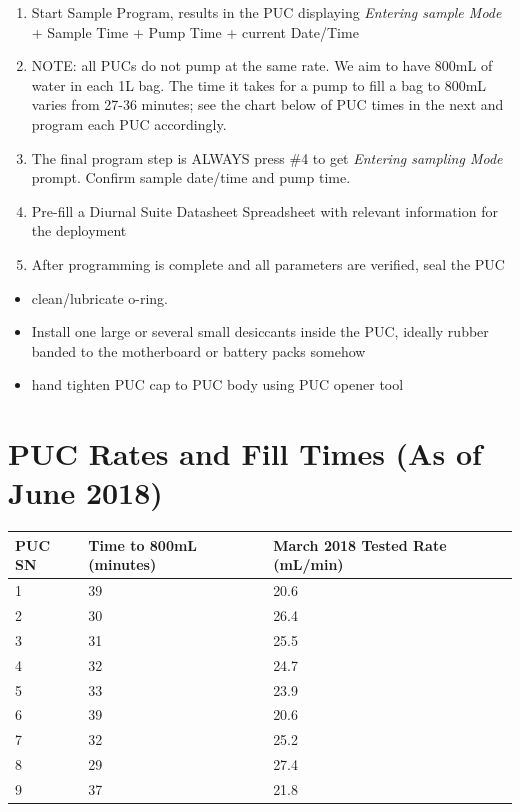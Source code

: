\documentclass[
]{book}
\providecommand{\tightlist}{%
  \setlength{\itemsep}{0pt}\setlength{\parskip}{0pt}}
\begin{document}
\begin{enumerate}
\def\labelenumi{\arabic{enumi}.}
\setcounter{enumi}{6}
\item
  Start Sample Program, results in the PUC displaying \emph{Entering sample Mode} + Sample Time + Pump Time + current Date/Time
\item
  NOTE: all PUCs do not pump at the same rate. We aim to have 800mL of water in each 1L bag. The time it takes for a pump to fill a bag to 800mL varies from 27-36 minutes; see the chart below of PUC times in the next and program each PUC accordingly.
\item
  The final program step is ALWAYS press \#4 to get \emph{Entering sampling Mode} prompt. Confirm sample date/time and pump time.
\item
  Pre-fill a Diurnal Suite Datasheet Spreadsheet with relevant information for the deployment
\item
  After programming is complete and all parameters are verified, seal the PUC
\end{enumerate}

\begin{itemize}
\tightlist
\item
  clean/lubricate o-ring.
\item
  Install one large or several small desiccants inside the PUC, ideally rubber banded to the motherboard or battery packs somehow
\item
  hand tighten PUC cap to PUC body using PUC opener tool
\end{itemize}

\hypertarget{puc-rates-and-fill-times-as-of-june-2018}{%
\section{PUC Rates and Fill Times (As of June 2018)}\label{puc-rates-and-fill-times-as-of-june-2018}}

\begin{longtable}[]{@{}lll@{}}
\toprule
\textbf{PUC SN} & \textbf{Time to 800mL (minutes)} & \textbf{March 2018 Tested Rate (mL/min)} \\
\midrule
\endhead
1 & 39 & 20.6 \\
2 & 30 & 26.4 \\
3 & 31 & 25.5 \\
4 & 32 & 24.7 \\
5 & 33 & 23.9 \\
6 & 39 & 20.6 \\
7 & 32 & 25.2 \\
8 & 29 & 27.4 \\
9 & 37 & 21.8 \\
\bottomrule
\end{longtable}
\end{document}
